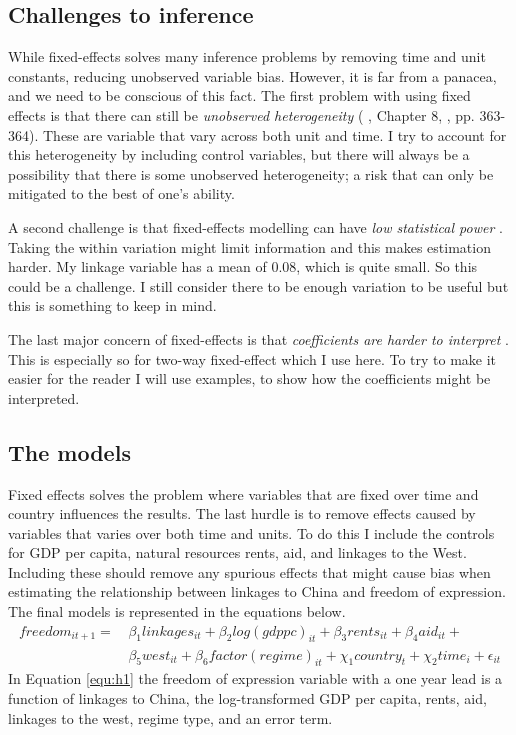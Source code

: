 \subsection{Challenges to inference}
While fixed-effects solves many inference problems by removing time and unit constants, reducing unobserved variable bias. However, it is far from a panacea, and we need to be conscious of this fact. The first problem with using fixed effects is that there can still be \textit{unobserved heterogeneity} (\citeauthor{cunningham_causal_2021} \citeyear{cunningham_causal_2021}, Chapter 8, \citeauthor{hill_limitations_2020} \citeyear{hill_limitations_2020}, pp. 363-364). These are variable that vary across both unit and time. I try to account for this heterogeneity by including control variables, but there will always be a possibility that there is some unobserved heterogeneity; a risk that can only be mitigated to the best of one's ability.

A second challenge is that fixed-effects modelling can have \textit{low statistical power} \citep[pp. 361-362]{hill_limitations_2020}. Taking the within variation might limit information and this makes estimation harder. My linkage variable has a mean of 0.08, which is quite small. So this could be a challenge. I still consider there to be enough variation to be useful but this is something to keep in mind.

The last major concern of fixed-effects is that \textit{coefficients are harder to interpret} \citep[pp. 364-365]{hill_limitations_2020}. This is especially so for two-way fixed-effect which I use here. To try to make it easier for the reader I will use examples, to show how the coefficients might be interpreted.

\subsection{The models}
Fixed effects solves the problem where variables that are fixed over time and country influences the results. The last hurdle is to remove effects caused by variables that varies over both time and units. To do this I include the controls for GDP per capita, natural resources rents, aid, and linkages to the West. Including these should remove any spurious effects that might cause bias when estimating the relationship between linkages to China and freedom of expression. The final models is represented in the equations below.
\begin{align} \label{equ:h1}
    freedom_{it+1} =\, & \beta_1  linkages_{it} + \beta_2 log(gdppc)_{it} + \beta_3 rents_{it} + \beta_4aid_{it} + \nonumber\\
    & \beta_5 west_{it} + \beta_6  factor(regime)_{it} + \chi_1 country_t + \chi_2 time_i + \epsilon_{it}
\end{align}
In Equation \ref{equ:h1} the freedom of expression variable with a one year lead is a function of  linkages to China, the log-transformed GDP per capita, rents, aid, linkages to the west, regime type, and an error term.

